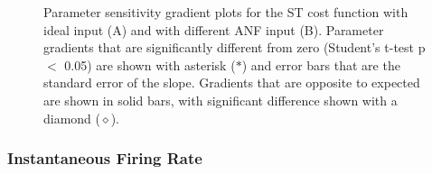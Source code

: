 % 
% 


\begin{figure}[th]
  \centering
  \caption{Parameter sensitivity gradient plots for the ST cost
    function with ideal input (A) and with different ANF input
    (B). Parameter gradients that are significantly different from
    zero (Student's t-test p $<$ 0.05) are shown with asterisk
    ($\ast$) and error bars that are the standard error of the
    slope. Gradients that are opposite to expected are shown in
    solid bars, with significant difference shown with a diamond
    ($\diamond$).}
  \label{fig:GA:13}
\end{figure}

\subsubsection{Instantaneous Firing Rate}

